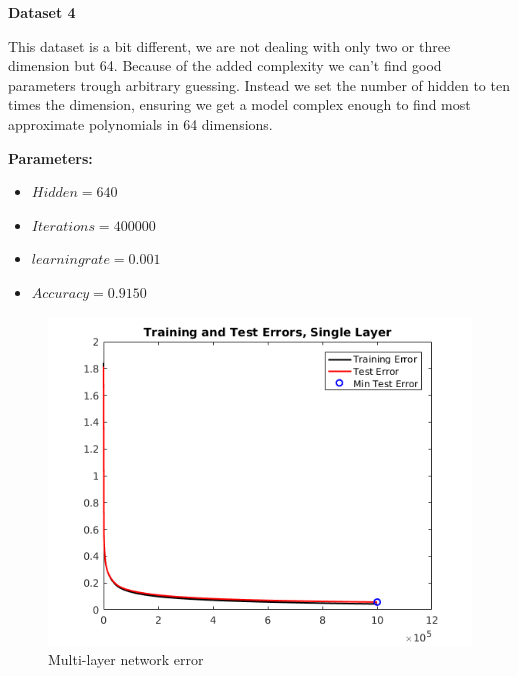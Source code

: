 \documentclass[a4paper,12pt]{article}
\begin{document}
\noindent \textbf{Dataset 4}

This dataset is a bit different, we are not dealing with only two or three dimension but 64. Because of the added complexity we can't find good parameters trough arbitrary guessing. Instead we set the number of hidden  to ten times the dimension, ensuring we get a model complex enough to find most approximate polynomials in 64 dimensions.

\textbf{Parameters:}
\begin{itemize}
\item $Hidden = 640$
\item $Iterations = 400000$
\item $learning rate = 0.001$
\item $Accuracy = 0.9150$
\end{itemize}

\begin{figure}[H]
\centering
  \begin{minipage}[]{1\textwidth}
  \caption{Multi-layer network error}\label{fig:multi_4_error}
  \includegraphics[width=\textwidth]{figures/multi_4_error.png}
  \end{minipage}
\end{figure}
\end{document}
